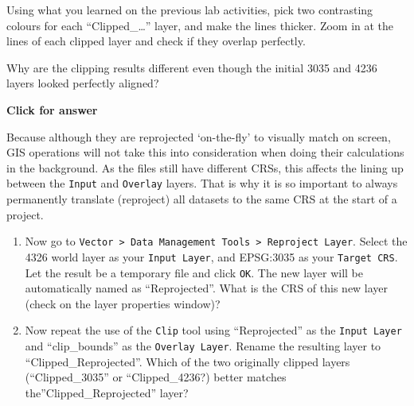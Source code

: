 \documentclass[
  letterpaper,
  DIV=11,
  numbers=noendperiod]{scrreprt}
\begin{document}
Using what you learned on the previous lab activities, pick two
contrasting colours for each ``Clipped\_\ldots{}'' layer, and make the
lines thicker. Zoom in at the lines of each clipped layer and check if
they overlap perfectly.

\begin{tcolorbox}[enhanced jigsaw, coltitle=black, toprule=.15mm, breakable, opacitybacktitle=0.6, left=2mm, colback=white, leftrule=.75mm, rightrule=.15mm, colbacktitle=quarto-callout-important-color!10!white, toptitle=1mm, titlerule=0mm, colframe=quarto-callout-important-color-frame, arc=.35mm, bottomtitle=1mm, opacityback=0, bottomrule=.15mm, title=\textcolor{quarto-callout-important-color}{\faExclamation}\hspace{0.5em}{Stop and Think}]

Why are the clipping results different even though the initial 3035 and
4236 layers looked perfectly aligned?

\end{tcolorbox}

\begin{tcolorbox}[enhanced jigsaw, toprule=.15mm, breakable, left=2mm, colframe=quarto-callout-important-color-frame, colback=white, arc=.35mm, leftrule=.75mm, opacityback=0, rightrule=.15mm, bottomrule=.15mm]

\vspace{-3mm}\textbf{Click for answer}\vspace{3mm}

Because although they are reprojected `on-the-fly' to visually match on
screen, GIS operations will not take this into consideration when doing
their calculations in the background. As the files still have different
CRSs, this affects the lining up between the \texttt{Input} and
\texttt{Overlay} layers. That is why it is so important to always
permanently translate (reproject) all datasets to the same CRS at the
start of a project.

\end{tcolorbox}

\begin{enumerate}
\def\labelenumi{(\arabic{enumi})}
\setcounter{enumi}{62}
\item
  Now go to
  \texttt{Vector\ \textgreater{}\ Data\ Management\ Tools\ \textgreater{}\ Reproject\ Layer}.
  Select the 4326 world layer as your \texttt{Input\ Layer}, and
  EPSG:3035 as your \texttt{Target\ CRS}. Let the result be a temporary
  file and click \texttt{OK}. The new layer will be automatically named
  as ``Reprojected''. What is the CRS of this new layer (check on the
  layer properties window)?
\item
  Now repeat the use of the \texttt{Clip} tool using ``Reprojected'' as
  the \texttt{Input\ Layer} and ``clip\_bounds'' as the
  \texttt{Overlay\ Layer}. Rename the resulting layer to
  ``Clipped\_Reprojected''. Which of the two originally clipped layers
  (``Clipped\_3035'' or ``Clipped\_4236?) better matches
  the''Clipped\_Reprojected'' layer?
\end{enumerate}
\end{document}
